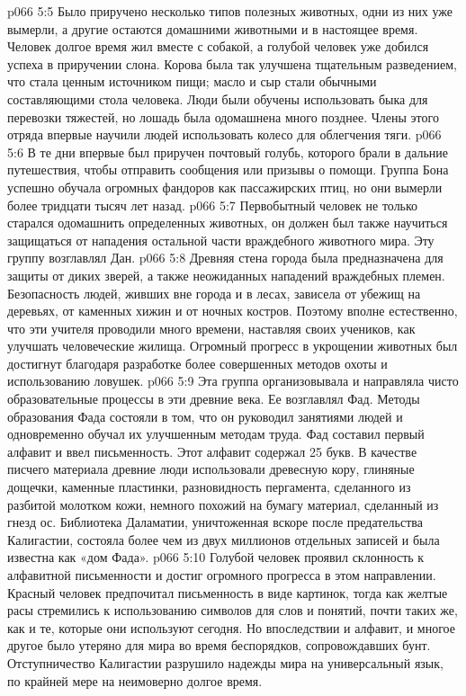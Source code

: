 \vs p066 5:5 Было приручено несколько типов полезных животных, одни из них уже вымерли, а другие остаются домашними животными и в настоящее время. Человек долгое время жил вместе с собакой, а голубой человек уже добился успеха в приручении слона. Корова была так улучшена тщательным разведением, что стала ценным источником пищи; масло и сыр стали обычными составляющими стола человека. Люди были обучены использовать быка для перевозки тяжестей, но лошадь была одомашнена много позднее. Члены этого отряда впервые научили людей использовать колесо для облегчения тяги.
\vs p066 5:6 В те дни впервые был приручен почтовый голубь, которого брали в дальние путешествия, чтобы отправить сообщения или призывы о помощи. Группа Бона успешно обучала огромных фандоров как пассажирских птиц, но они вымерли более тридцати тысяч лет назад.
\vs p066 5:7 \bibnobreakspace {} Первобытный человек не только старался одомашнить определенных животных, он должен был также научиться защищаться от нападения остальной части враждебного животного мира. Эту группу возглавлял Дан.
\vs p066 5:8 Древняя стена города была предназначена для защиты от диких зверей, а также неожиданных нападений враждебных племен. Безопасность людей, живших вне города и в лесах, зависела от убежищ на деревьях, от каменных хижин и от ночных костров. Поэтому вполне естественно, что эти учителя проводили много времени, наставляя своих учеников, как улучшать человеческие жилища. Огромный прогресс в укрощении животных был достигнут благодаря разработке более совершенных методов охоты и использованию ловушек.
\vs p066 5:9 \bibnobreakspace {} Эта группа организовывала и направляла чисто образовательные процессы в эти древние века. Ее возглавлял Фад. Методы образования Фада состояли в том, что он руководил занятиями людей и одновременно обучал их улучшенным методам труда. Фад составил первый алфавит и ввел письменность. Этот алфавит содержал 25 букв. В качестве писчего материала древние люди использовали древесную кору, глиняные дощечки, каменные пластинки, разновидность пергамента, сделанного из разбитой молотком кожи, немного похожий на бумагу материал, сделанный из гнезд ос. Библиотека Даламатии, уничтоженная вскоре после предательства Калигастии, состояла более чем из двух миллионов отдельных записей и была известна как «дом Фада».
\vs p066 5:10 Голубой человек проявил склонность к алфавитной письменности и достиг огромного прогресса в этом направлении. Красный человек предпочитал письменность в виде картинок, тогда как желтые расы стремились к использованию символов для слов и понятий, почти таких же, как и те, которые они используют сегодня. Но впоследствии и алфавит, и многое другое было утеряно для мира во время беспорядков, сопровождавших бунт. Отступничество Калигастии разрушило надежды мира на универсальный язык, по крайней мере на неимоверно долгое время.

